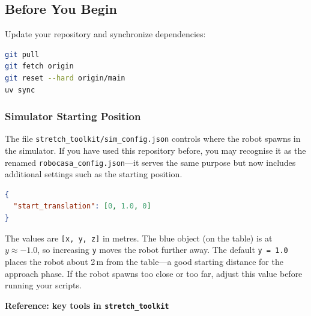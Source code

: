 \documentclass[11pt,a4paper]{article}
\begin{document}
\subsection*{Before You Begin}

Update your repository and synchronize dependencies:

\begin{lstlisting}[language=bash]
git pull
git fetch origin
git reset --hard origin/main
uv sync
\end{lstlisting}

\subsubsection*{Simulator Starting Position}

The file \texttt{stretch\_toolkit/sim\_config.json} controls where the robot spawns in the simulator. If you have used this repository before, you may recognise it as the renamed \texttt{robocasa\_config.json}---it serves the same purpose but now includes additional settings such as the starting position.

\begin{lstlisting}[language=json]
{
  "start_translation": [0, 1.0, 0]
}
\end{lstlisting}

The values are \texttt{[x, y, z]} in metres. The blue object (on the table) is at $y \approx -1.0$, so increasing \texttt{y} moves the robot further away. The default \texttt{y = 1.0} places the robot about 2\,m from the table---a good starting distance for the approach phase. If the robot spawns too close or too far, adjust this value before running your scripts.

\textbf{Reference: key tools in \texttt{stretch\_toolkit}}
\end{document}
